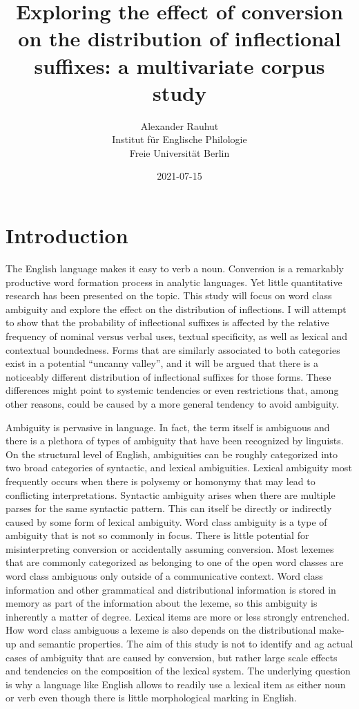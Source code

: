 \documentclass[
]{article}
\title{Exploring the effect of conversion on the distribution of
inflectional suffixes: a multivariate corpus study}
\author{Alexander Rauhut\\
Institut für Englische Philologie\\
Freie Universität Berlin}
\date{2021-07-15}
\begin{document}
\maketitle

{
\setcounter{tocdepth}{2}
\tableofcontents
}
\newpage

\hypertarget{introduction}{%
\section{Introduction}\label{introduction}}

The English language makes it easy to verb a noun. Conversion is a
remarkably productive word formation process in analytic languages. Yet
little quantitative research has been presented on the topic. This study
will focus on word class ambiguity and explore the effect on the
distribution of inflections. I will attempt to show that the probability
of inflectional suffixes is affected by the relative frequency of
nominal versus verbal uses, textual specificity, as well as lexical and
contextual boundedness. Forms that are similarly associated to both
categories exist in a potential ``uncanny valley'', and it will be
argued that there is a noticeably different distribution of inflectional
suffixes for those forms. These differences might point to systemic
tendencies or even restrictions that, among other reasons, could be
caused by a more general tendency to avoid ambiguity.

Ambiguity is pervasive in language. In fact, the term itself is
ambiguous and there is a plethora of types of ambiguity that have been
recognized by linguists. On the structural level of English, ambiguities
can be roughly categorized into two broad categories of syntactic, and
lexical ambiguities. Lexical ambiguity most frequently occurs when there
is polysemy or homonymy that may lead to conflicting interpretations.
Syntactic ambiguity arises when there are multiple parses for the same
syntactic pattern. This can itself be directly or indirectly caused by
some form of lexical ambiguity. Word class ambiguity is a type of
ambiguity that is not so commonly in focus. There is little potential
for misinterpreting conversion or accidentally assuming conversion. Most
lexemes that are commonly categorized as belonging to one of the open
word classes are word class ambiguous only outside of a communicative
context. Word class information and other grammatical and distributional
information is stored in memory as part of the information about the
lexeme, so this ambiguity is inherently a matter of degree. Lexical
items are more or less strongly entrenched. How word class ambiguous a
lexeme is also depends on the distributional make-up and semantic
properties. The aim of this study is not to identify and ag actual cases
of ambiguity that are caused by conversion, but rather large scale
effects and tendencies on the composition of the lexical system. The
underlying question is why a language like English allows to readily use
a lexical item as either noun or verb even though there is little
morphological marking in English.
\end{document}

